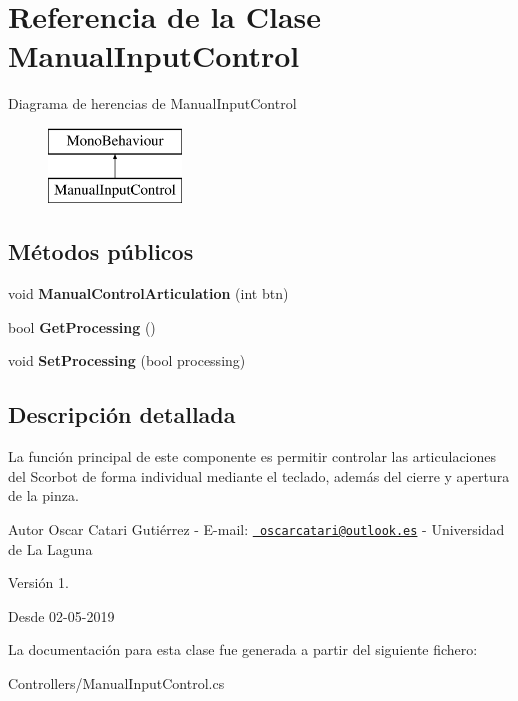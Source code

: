 \hypertarget{class_manual_input_control}{}\section{Referencia de la Clase Manual\+Input\+Control}
\label{class_manual_input_control}
Diagrama de herencias de Manual\+Input\+Control\begin{figure}[H]
\begin{center}
\leavevmode
\includegraphics[height=2.000000cm]{class_manual_input_control}
\end{center}
\end{figure}
\subsection*{Métodos públicos}
\begin{DoxyCompactItemize}
\item 
\mbox{\label{class_manual_input_control_a1e39de6319d6aad69e82f083d6d42058}} 
void {\bfseries Manual\+Control\+Articulation} (int btn)
\item 
\mbox{\label{class_manual_input_control_a00de8f95d74cefb32806a4262fd90aba}} 
bool {\bfseries Get\+Processing} ()
\item 
\mbox{\label{class_manual_input_control_a8505abe190f5ce3a1a1b76d2e94e695f}} 
void {\bfseries Set\+Processing} (bool processing)
\end{DoxyCompactItemize}


\subsection{Descripción detallada}
La función principal de este componente es permitir controlar las articulaciones del Scorbot de forma individual mediante el teclado, además del cierre y apertura de la pinza. \begin{DoxyAuthor}{Autor}
Oscar Catari Gutiérrez -\/ E-\/mail\+: \href{mailto:oscarcatari@outlook.es}{\texttt{ oscarcatari@outlook.\+es}} -\/ Universidad de La Laguna 
\end{DoxyAuthor}
\begin{DoxyVersion}{Versión}
1. 
\end{DoxyVersion}
\begin{DoxySince}{Desde}
02-\/05-\/2019 
\end{DoxySince}


La documentación para esta clase fue generada a partir del siguiente fichero\+:\begin{DoxyCompactItemize}
\item 
Controllers/Manual\+Input\+Control.\+cs\end{DoxyCompactItemize}
